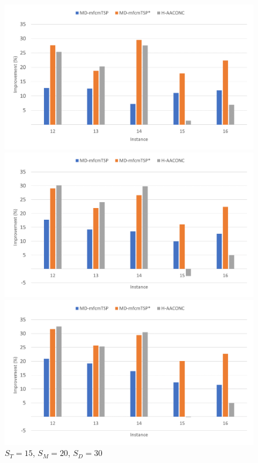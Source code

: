 \documentclass{article}
\begin{document}
	\begin{figure}[h]
		\centering
		\begin{minipage}{0.33\textwidth}
			\centering
			\includegraphics[scale=0.42]{large_15-15-15}\;
			\caption{$S_T=15$, $S_M=15$, $S_D=15$}
			\label{fig:large_15-15-15}
		\end{minipage}
		\begin{minipage}{0.33\textwidth}
			\centering
			\includegraphics[scale=0.42]{large_15-20-20}\;
			\caption{$S_T=15$, $S_M=20$, $S_D=20$}
			\label{fig:large_15-20-20}
		\end{minipage}
		\begin{minipage}{0.33\textwidth}
			\centering
			\includegraphics[scale=0.42]{large_15-20-30}\;
			\caption{$S_T=15$, $S_M=20$, $S_D=30$}
			\label{fig:large_15-20-30}
		\end{minipage}
	\end{figure}
	
\end{document}
